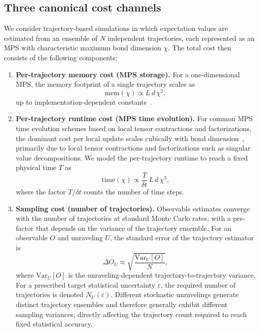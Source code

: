 \documentclass[aps, pra, superscriptaddress, reprint, floatfix]{revtex4-2}
\theoremstyle{plain}
\begin{document}
\subsection{Three canonical cost channels}
We consider trajectory-based simulations in which expectation values are estimated from an ensemble of $N$ independent trajectories, each represented as an MPS with characteristic maximum bond dimension $\chi$. The total cost then consists of the following components:
\begin{enumerate}
\item {\textbf{Per-trajectory memory cost (MPS storage).}}
For a one-dimensional MPS, the memory footprint of a single trajectory scales as
\begin{equation}
\mathrm{mem}(\chi) \propto L\, d\, \chi^2,
\label{eq:mem_scaling_def}
\end{equation}
up to implementation-dependent constants~\cite{Schollwock_2011}.

\item{\textbf{Per-trajectory runtime cost (MPS time evolution).}}
For common MPS time evolution schemes based on local tensor contractions and factorizations, the dominant cost per local update scales cubically with bond dimension~\cite{Paeckel_2019, Schollwock_2011}, primarily due to local tensor contractions and factorizations such as singular value decompositions. We model the per-trajectory runtime to reach a fixed physical time $T$ as
\begin{equation}
\mathrm{time}(\chi)
\propto
\frac{T}{\delta t}\, L\, d\, \chi^3,
\label{eq:time_scaling_def}
\end{equation}
where the factor $T/\delta t$ counts the number of time steps.

\item{\textbf{Sampling cost (number of trajectories).}}
Observable estimates converge with the number of trajectories at standard Monte Carlo rates, with a pre-factor that depends on the variance of the trajectory ensemble. For an observable $O$ and unraveling $U$, the standard error of the trajectory estimator is
\begin{equation}
\Delta O_U
\approx
\sqrt{\frac{\mathrm{Var}_U[O]}{N}},
\end{equation}
where $\mathrm{Var}_U[O]$ is the unraveling-dependent trajectory-to-trajectory variance. For a prescribed target statistical uncertainty $\varepsilon$, the required number of trajectories is denoted $N_U(\varepsilon)$. Different stochastic unravelings generate distinct trajectory ensembles and therefore generally exhibit different sampling variances, directly affecting the trajectory count required to reach fixed statistical accuracy.
\end{enumerate}
\end{document}
